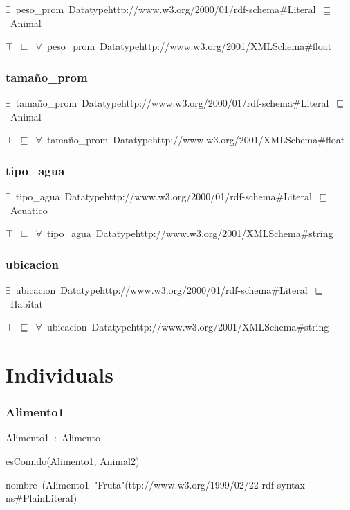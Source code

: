 \ensuremath{\exists}~peso\_prom~Datatypehttp://www.w3.org/2000/01/rdf-schema\#Literal~\ensuremath{\sqsubseteq}~Animal

\ensuremath{\top}~\ensuremath{\sqsubseteq}~\ensuremath{\forall}~peso\_prom~Datatypehttp://www.w3.org/2001/XMLSchema\#float

\subsubsection*{tamaño\_prom}

\ensuremath{\exists}~tamaño\_prom~Datatypehttp://www.w3.org/2000/01/rdf-schema\#Literal~\ensuremath{\sqsubseteq}~Animal

\ensuremath{\top}~\ensuremath{\sqsubseteq}~\ensuremath{\forall}~tamaño\_prom~Datatypehttp://www.w3.org/2001/XMLSchema\#float

\subsubsection*{tipo\_agua}

\ensuremath{\exists}~tipo\_agua~Datatypehttp://www.w3.org/2000/01/rdf-schema\#Literal~\ensuremath{\sqsubseteq}~Acuatico

\ensuremath{\top}~\ensuremath{\sqsubseteq}~\ensuremath{\forall}~tipo\_agua~Datatypehttp://www.w3.org/2001/XMLSchema\#string

\subsubsection*{ubicacion}

\ensuremath{\exists}~ubicacion~Datatypehttp://www.w3.org/2000/01/rdf-schema\#Literal~\ensuremath{\sqsubseteq}~Habitat

\ensuremath{\top}~\ensuremath{\sqsubseteq}~\ensuremath{\forall}~ubicacion~Datatypehttp://www.w3.org/2001/XMLSchema\#string

\section*{Individuals}\subsubsection*{Alimento1}

Alimento1~:~Alimento

esComido(Alimento1, Animal2)

nombre~(Alimento1~"Fruta"^^http://www.w3.org/1999/02/22-rdf-syntax-ns\#PlainLiteral)

